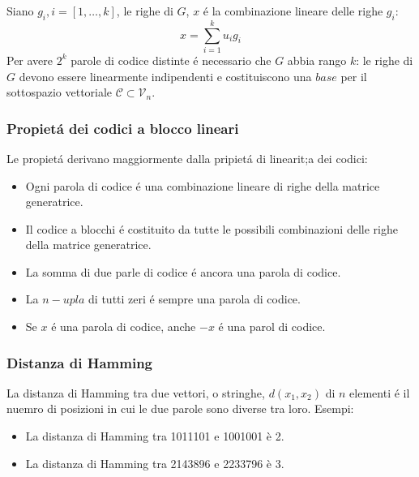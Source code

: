             Siano $g_i, i = [1, \dots, k]$, le righe di $G$, $x$ é la combinazione lineare delle righe $g_i$:
            \[
                x = \sum_{i=1}^{k}u_ig_i  
            \]
            Per avere $2^k$ parole di codice distinte  é necessario che $G$ abbia rango $k$: le righe di $G$ devono essere linearmente indipendenti e costituiscono 
            una $base$ per il sottospazio vettoriale $\mathcal{C} \subset \mathcal{V}_n$.  

        \subsubsection{Propietá dei codici a blocco lineari}
            Le propietá derivano maggiormente dalla pripietá di linearit;a dei codici:
            \begin{itemize}
                \item {Ogni parola di codice é una combinazione lineare di righe della matrice generatrice.}
                \item {Il codice a blocchi é costituito da tutte le possibili combinazioni delle righe della matrice generatrice.}
                \item {La somma di due parle di codice é ancora una parola di codice.}
                \item {La $n-upla$ di tutti zeri é sempre una parola di codice.}
                \item {Se $x$ é una parola di codice, anche $-x$ é una parol di codice.}
            \end{itemize}

        \subsubsection{Distanza di Hamming}\label{Distanza di Hamming}
            La distanza di Hamming tra due vettori, o stringhe, $d(x_1,x_2)$ di $n$ elementi é il nuemro di posizioni in cui le due parole
            sono diverse tra loro. Esempi:
            \begin{itemize}
                \item {
                    La distanza di Hamming tra 10{\color{red}1}1{\color{red}1}01 e 10{\color{red}0}1{\color{red}0}01 è 2.
                }
                \item {
                    La distanza di Hamming tra 2{\color{red}14}3{\color{red}8}96 e 2{\color{red}23}3{\color{red}7}96 è 3.
                }
            \end{itemize}
